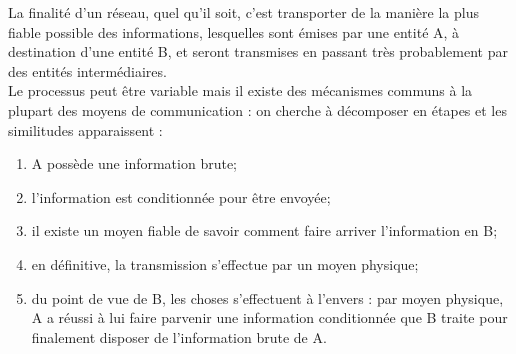 \documentclass[a4paper,12pt]{book}
\begin{document}
La finalité d'un réseau, quel qu'il soit, c'est transporter de la manière la plus fiable possible des informations, lesquelles sont émises par une entité A, à destination d'une entité B, et seront transmises en passant très probablement par des entités intermédiaires.\\
Le processus peut être variable mais il existe des mécanismes communs à la plupart des moyens de communication : on cherche à décomposer en étapes et les similitudes apparaissent :
\begin{enumerate}[--]
	\item 	A possède une information \og brute\fg{};
	\item 	l'information est \og conditionnée\fg{} pour être envoyée;
	\item 	il existe un moyen fiable de savoir comment faire arriver l'information en B;
	\item 	en définitive, la transmission s'effectue par un moyen physique;
	\item 	du point de vue de B, les choses s'effectuent \og à l'envers\fg{} : par moyen physique, A a réussi à lui faire parvenir une information \og conditionnée\fg{} que B traite pour finalement disposer de l'information brute de A.
\end{enumerate}
\end{document}
